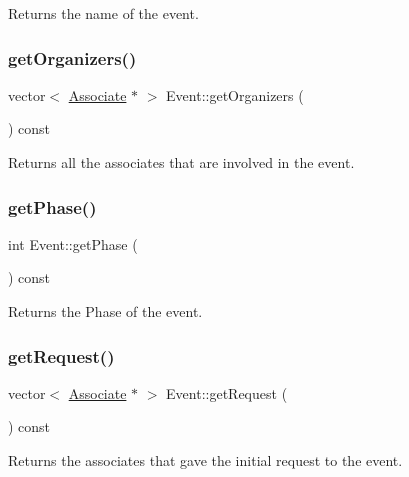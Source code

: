 Returns the name of the event. 

\mbox{\label{classEvent_a7e09dd7707422e30104727a069573e88}} 
\subsubsection{\texorpdfstring{get\+Organizers()}{getOrganizers()}}
{\footnotesize\ttfamily vector$<$ \mbox{\hyperlink{classAssociate}{Associate}} $\ast$ $>$ Event\+::get\+Organizers (\begin{DoxyParamCaption}{ }\end{DoxyParamCaption}) const}



Returns all the associates that are involved in the event. 

\mbox{\label{classEvent_a1f6eac3425718082f5445a46a236b837}} 
\subsubsection{\texorpdfstring{get\+Phase()}{getPhase()}}
{\footnotesize\ttfamily int Event\+::get\+Phase (\begin{DoxyParamCaption}{ }\end{DoxyParamCaption}) const}



Returns the Phase of the event. 

\mbox{\label{classEvent_a424a2862591a8437b0d18366c7aee247}} 
\subsubsection{\texorpdfstring{get\+Request()}{getRequest()}}
{\footnotesize\ttfamily vector$<$ \mbox{\hyperlink{classAssociate}{Associate}} $\ast$ $>$ Event\+::get\+Request (\begin{DoxyParamCaption}{ }\end{DoxyParamCaption}) const}



Returns the associates that gave the initial request to the event. 

